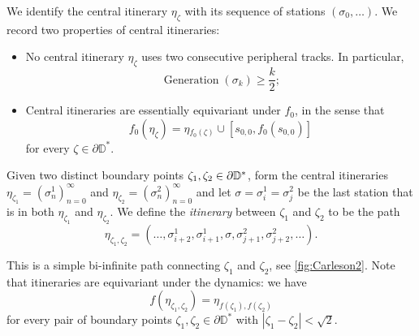 

We identify the central itinerary $\eta_{\zeta}$ with its sequence of stations $(\sigma_0,\ldots)$. We record two properties of central itineraries:

\begin{itemize}
	\item No central itinerary $\eta_{\zeta}$ uses two consecutive peripheral tracks. In particular,
	\begin{equation}
	\label{generation-lower-bound}
		\operatorname{Generation}(\sigma_k)\geq \frac k2;
	\end{equation}
	
	\item Central itineraries are essentially equivariant under $f_{0}$, in the sense that
	\begin{equation*}
		f_{0}(\eta_{\zeta})=\eta{}_{f_{0}(\zeta)}\cup[s_{0,0},f_0(s_{0,0})]
	\end{equation*}
	for every $\zeta\in \partial \mathbb D^*$.
\end{itemize}

\begin{definition}
\label{def-disk-itinerary}
Given two distinct boundary points $\zeta_{1},\zeta_{2}\in\partial\mathbb{D}^*$, form the central itineraries $\eta_{\zeta_{1}}=\left(\sigma_{n}^{1}\right)_{n=0}^{\infty}$ and $\eta_{\zeta_{2}}=\left(\sigma_{n}^{2}\right)_{n=0}^{\infty}$ and let  $\sigma=\sigma^1_i=\sigma^2_j$ be the last station that is in both $\eta_{\zeta_{1}}$ and $\eta_{\zeta_{2}}$.  
	 We define the \emph{itinerary} between  $\zeta_{1}$ and $\zeta_{2}$ to be the path 
$$
 \eta_{\zeta_{1},\zeta_{2}}=  \left(\dots,\sigma_{i+2}^{1},\sigma_{i+1}^{1},\sigma,\sigma_{j+1}^{2},\sigma_{j+2}^{2},\dots\right).
$$

	This is a simple bi-infinite path connecting $\zeta_{1}$ and $\zeta_{2}$, see \cref{fig:Carleson2}. Note that itineraries are equivariant under the dynamics: we have  \begin{equation}
		f(\eta_{\zeta_1,\zeta_2})=\eta_{f(\zeta_1),f(\zeta_2)}
	\end{equation} for every pair of boundary points $\zeta_1,\zeta_2 \in \partial \mathbb D^*$ with $|\zeta_1-\zeta_2| < \sqrt{2}$.
\end{definition}


